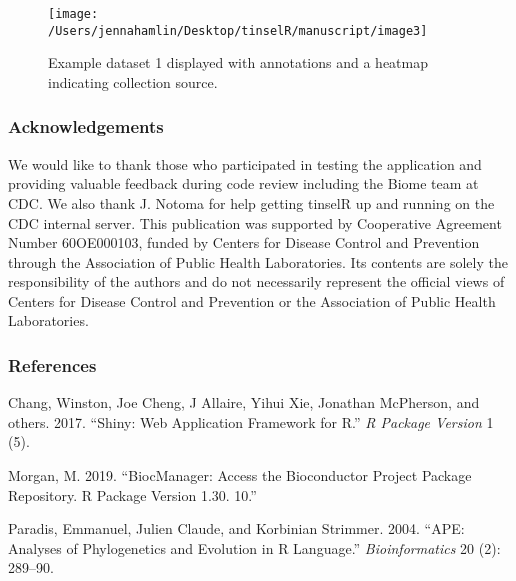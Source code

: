 \documentclass[
]{article}
\begin{document}
\begin{figure}

{\centering \texttt{[image: /Users/jennahamlin/Desktop/tinselR/manuscript/image3]} 

}

\caption{Example dataset 1 displayed with annotations and a heatmap indicating collection source.}\label{fig:fig1}
\end{figure}

\break

\hypertarget{acknowledgements}{%
\subsubsection{Acknowledgements}\label{acknowledgements}}

We would like to thank those who participated in testing the application
and providing valuable feedback during code review including the Biome
team at CDC. We also thank J. Notoma for help getting tinselR up and
running on the CDC internal server. This publication was supported by
Cooperative Agreement Number 60OE000103, funded by Centers for Disease
Control and Prevention through the Association of Public Health
Laboratories. Its contents are solely the responsibility of the authors
and do not necessarily represent the official views of Centers for
Disease Control and Prevention or the Association of Public Health
Laboratories.

\break

\hypertarget{references}{%
\subsubsection*{References}\label{references}}

\hypertarget{refs}{}
\leavevmode\hypertarget{ref-chang2017shiny}{}%
Chang, Winston, Joe Cheng, J Allaire, Yihui Xie, Jonathan McPherson, and
others. 2017. ``Shiny: Web Application Framework for R.'' \emph{R
Package Version} 1 (5).

\leavevmode\hypertarget{ref-morgan2019biocmanager}{}%
Morgan, M. 2019. ``BiocManager: Access the Bioconductor Project Package
Repository. R Package Version 1.30. 10.''

\leavevmode\hypertarget{ref-paradis2004ape}{}%
Paradis, Emmanuel, Julien Claude, and Korbinian Strimmer. 2004. ``APE:
Analyses of Phylogenetics and Evolution in R Language.''
\emph{Bioinformatics} 20 (2): 289--90.
\end{document}
